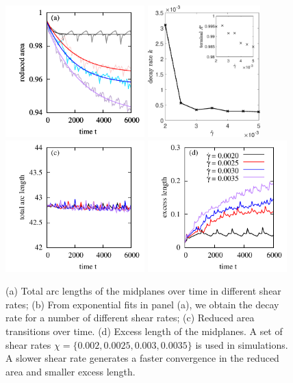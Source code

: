 \documentclass[lineno]{jfm}
\begin{document}
\begin{figure}
\begin{center}
\hspace{-0.6cm}
\includegraphics[height=2in]{ReducedArea.pdf}
\hspace{0.6cm}
\includegraphics[height=2in]{DecayRate.eps}\\
\includegraphics[height=2in]{ArcLength.pdf}
\includegraphics[height=2in]{ExcLength.pdf}
\end{center} 
  \caption{(a) Total arc lengths of the midplanes over time in different shear rates; (b) From exponential fits in panel (a), we obtain the decay rate for a number of different shear rates;
  (c) Reduced area transitions over time. (d) Excess length of the midplanes.
A set of shear rates $\chi=\{0.002,0.0025,0.003,0.0035\}$ is used in simulations. 
A slower shear rate generates a faster convergence in the reduced area and smaller excess length. 
  }
    \label{figure4}
\end{figure}
\end{document}
